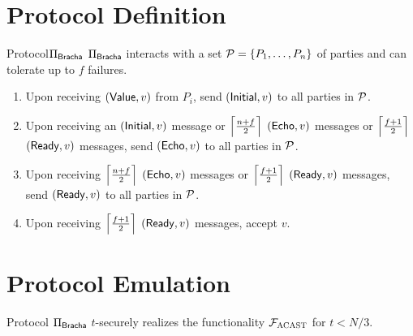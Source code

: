 \documentclass{llncs}
\begin{document}
\section{Protocol Definition}

\begin{boxdef}{Protocol}{$\Pi_{\sf Bracha}$}
  $\Pi_{\sf Bracha}$ interacts with a set $\mathcal{{P}} = \{ P_1, \ldots, P_n \}$ of
  parties and can tolerate up to $f$ failures.
  \begin{enumerate}
    \item Upon receiving $({\sf Value}, v)$ from $P_i$, send $({\sf Initial},
  v)$ to all parties in $\mathcal{{P}}$.
  
    \item Upon receiving an $({\sf Initial}, v)$ message or
  $\left\lceil \frac{n+f}{2} \right\rceil$ $({\sf Echo}, v)$ messages or $\left\lceil \frac{f+1}{2} \right\rceil$
  $({\sf Ready}, v)$ messages, send $({\sf Echo}, v)$ to all parties in
  $\mathcal{{P}}$.

    \item Upon receiving $\left\lceil \frac{n+f}{2} \right\rceil$ $({\sf Echo}, v)$ messages or
  $\left\lceil \frac{f+1}{2} \right\rceil$ $({\sf Ready}, v)$ messages, send $({\sf Ready}, v)$ to
  all parties in $\mathcal{{P}}$.

    \item Upon receiving $\left\lceil \frac{f+1}{2} \right\rceil$ $({\sf Ready}, v)$ messages,
    accept $v$.
  \end{enumerate}
\end{boxdef}

\section{Protocol Emulation}

\begin{theorem}
Protocol $\Pi_{\sf Bracha}$ $t$-securely realizes the functionality $\mathcal{{F}}_{\textsc{ACAST}}$
for $t < N/3$.
\end{theorem}
\end{document}

